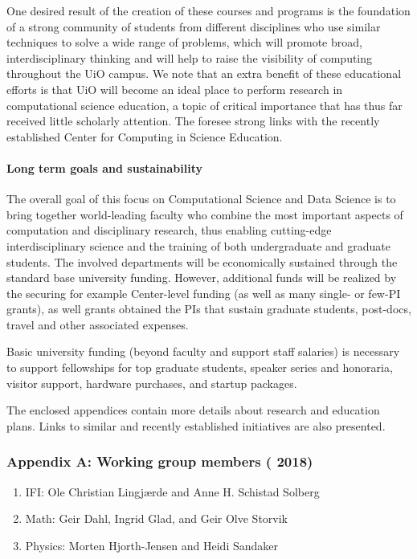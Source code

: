 \documentclass[]{article}
\providecommand{\tightlist}{%
  \setlength{\itemsep}{0pt}\setlength{\parskip}{0pt}}
\let\oldparagraph\paragraph
\renewcommand{\paragraph}[1]{\oldparagraph{#1}\mbox{}}
\begin{document}
One desired result of the creation of these courses and programs is the
foundation of a strong community of students from different disciplines
who use similar techniques to solve a wide range of problems, which will
promote broad, interdisciplinary thinking and will help to raise the
visibility of computing throughout the UiO campus. We note that an extra
benefit of these educational efforts is that UiO will become an ideal
place to perform research in computational science education, a topic of
critical importance that has thus far received little scholarly
attention. The foresee strong links with the recently established Center
for Computing in Science Education.

\hypertarget{long-term-goals-and-sustainability}{%
\paragraph{Long term goals and
sustainability}\label{long-term-goals-and-sustainability}}

The overall goal of this focus on Computational Science and Data Science
is to bring together world-leading faculty who combine the most
important aspects of computation and disciplinary research, thus
enabling cutting-edge interdisciplinary science and the training of both
undergraduate and graduate students. The involved departments will be
economically sustained through the standard base university funding.
However, additional funds will be realized by the securing for example
Center-level funding (as well as many single- or few-PI grants), as well
grants obtained the PIs that sustain graduate students, post-docs,
travel and other associated expenses.

Basic university funding (beyond faculty and support staff salaries) is
necessary to support fellowships for top graduate students, speaker
series and honoraria, visitor support, hardware purchases, and startup
packages.

The enclosed appendices contain more details about research and
education plans. Links to similar and recently established initiatives
are also presented.

\hypertarget{appendix-a-working-group-members-2018}{%
\subsubsection{Appendix A: Working group members (
2018)}\label{appendix-a-working-group-members-2018}}

\begin{enumerate}
\def\labelenumi{\arabic{enumi}.}
\tightlist
\item
  IFI: Ole Christian Lingjærde and Anne H. Schistad Solberg
\item
  Math: Geir Dahl, Ingrid Glad, and Geir Olve Storvik
\item
  Physics: Morten Hjorth-Jensen and Heidi Sandaker
\end{enumerate}
\end{document}
